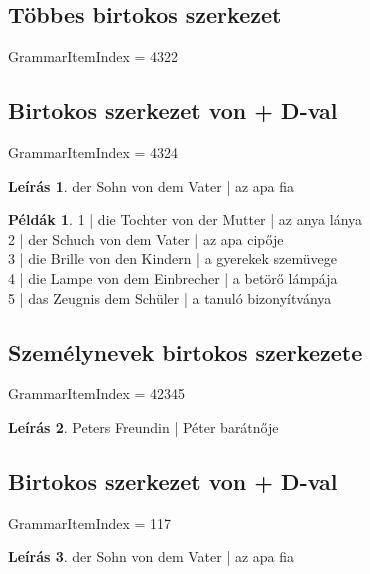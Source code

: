 \documentclass{article}
\theoremstyle{definition}
\newtheorem*{exmp}{Példák}
\newtheorem*{desc}{Leírás}
\begin{document}
\subsection{Többes birtokos szerkezet}

GrammarItemIndex = 4322

\subsection{Birtokos szerkezet von + D-val}

GrammarItemIndex = 4324

\begin{desc}
der Sohn von dem Vater | az apa fia
\end{desc}

\begin{exmp}
1 | die Tochter von der Mutter | az anya lánya\\
2 | der Schuch von dem Vater | az apa cipője\\
3 | die Brille von den Kindern | a gyerekek szemüvege\\
4 | die Lampe von dem Einbrecher | a betörő lámpája\\
5 | das Zeugnis dem  Schüler | a tanuló bizonyítványa\\
\end{exmp}

\subsection{Személynevek birtokos szerkezete}

GrammarItemIndex = 42345

\begin{desc}
Peters Freundin | Péter barátnője
\end{desc}

\subsection{Birtokos szerkezet von + D-val}

GrammarItemIndex = 117

\begin{desc}
der Sohn von dem Vater | az apa fia
\end{desc}
\end{document}
